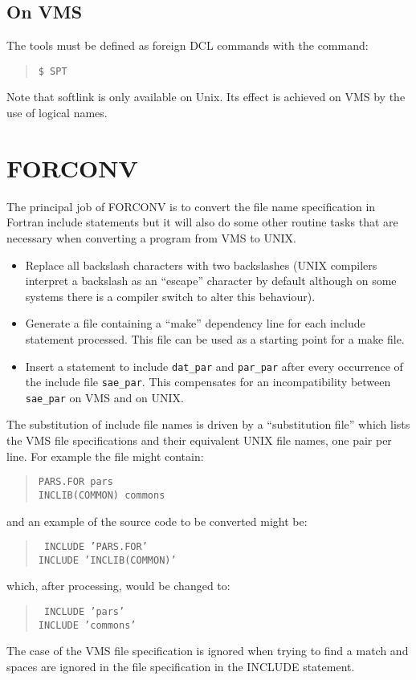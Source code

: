 \subsection{On VMS}
The tools must be defined as foreign DCL commands with the command:
\begin{quote}
{\tt \$ SPT}
\end{quote}
Note that softlink is only available on Unix. Its effect is achieved on VMS by
the use of logical names.

\section{FORCONV}

The principal job of FORCONV is to convert the file name specification
in Fortran include statements but it will also do some other routine tasks
that are necessary when converting a program from VMS to UNIX.
\begin{itemize}
\item Replace all backslash characters with two backslashes (UNIX
compilers interpret a backslash as an ``escape'' character by default
although on some systems there is a compiler switch to alter this
behaviour).

\item Generate a file containing a ``make'' dependency line for each
include statement processed. This file can be used as a starting point for a
make file.

\item Insert a statement to include {\tt dat\_par} and {\tt par\_par} after
every occurrence of the include file {\tt sae\_par}. This compensates for an
incompatibility  between {\tt sae\_par} on VMS and on UNIX.

\end{itemize}

The substitution of include file names is driven by a ``substitution
file'' which lists the VMS file specifications and their equivalent UNIX
file names, one pair per line. For example the file might contain:
\begin{quote}
{\tt PARS.FOR pars\\
INCLIB(COMMON) commons}
\end{quote}
and an example of the source code to be converted might be:
\begin{quote}
{\tt
      INCLUDE 'PARS.FOR'\\
      INCLUDE 'INCLIB(COMMON)'}
\end{quote}
which, after processing, would be changed to:
\begin{quote}
{\tt
      INCLUDE 'pars'\\
      INCLUDE 'commons'}
\end{quote}
The case of the VMS file specification is ignored when trying to find a
match and spaces are ignored in the file specification in the INCLUDE
statement.

